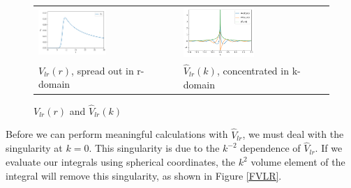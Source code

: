 \documentclass[letterpaper, 12pt]{article}
\begin{document}
\begin{figure}[h]
	\begin{tabular}[m]{m{}m{}}
		\includegraphics[width=0.5\textwidth]{Images/Vlra8b1.png} & 
		\includegraphics[width=0.5\textwidth]{Images/FVlr.png}\\
		\centering$V_{lr}(r)$, spread out in r-domain & 
		\centering$\hat{V}_{lr}(k)$, concentrated in k-domain
	\end{tabular}
	\caption{$V_{lr}(r)$ and $\hat{V}_{lr}(k)$}	
	\label{TransformVlr}
\end{figure} 
 
Before we can perform meaningful calculations with $\hat{V}_{lr}$, we must deal with the singularity at $k=0$. This singularity is due to the $k^{-2}$ dependence of $\hat{V}_{lr}$. If we evaluate our integrals using spherical coordinates, the $k^2$ volume element of the integral will remove this singularity, as shown in Figure \ref{FVLR}. 
\end{document}
